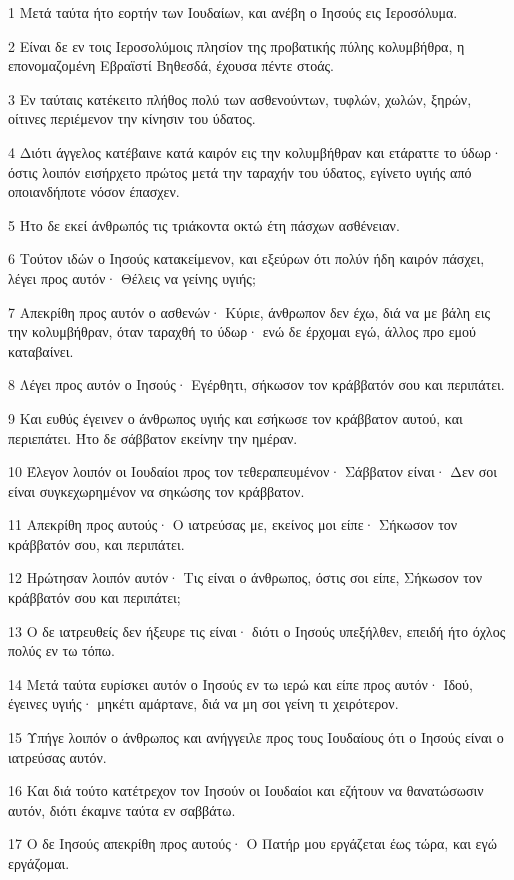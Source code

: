 \par 1 Μετά ταύτα ήτο εορτήν των Ιουδαίων, και ανέβη ο Ιησούς εις Ιεροσόλυμα.
\par 2 Είναι δε εν τοις Ιεροσολύμοις πλησίον της προβατικής πύλης κολυμβήθρα, η επονομαζομένη Εβραϊστί Βηθεσδά, έχουσα πέντε στοάς.
\par 3 Εν ταύταις κατέκειτο πλήθος πολύ των ασθενούντων, τυφλών, χωλών, ξηρών, οίτινες περιέμενον την κίνησιν του ύδατος.
\par 4 Διότι άγγελος κατέβαινε κατά καιρόν εις την κολυμβήθραν και ετάραττε το ύδωρ· όστις λοιπόν εισήρχετο πρώτος μετά την ταραχήν του ύδατος, εγίνετο υγιής από οποιανδήποτε νόσον έπασχεν.
\par 5 Ήτο δε εκεί άνθρωπός τις τριάκοντα οκτώ έτη πάσχων ασθένειαν.
\par 6 Τούτον ιδών ο Ιησούς κατακείμενον, και εξεύρων ότι πολύν ήδη καιρόν πάσχει, λέγει προς αυτόν· Θέλεις να γείνης υγιής;
\par 7 Απεκρίθη προς αυτόν ο ασθενών· Κύριε, άνθρωπον δεν έχω, διά να με βάλη εις την κολυμβήθραν, όταν ταραχθή το ύδωρ· ενώ δε έρχομαι εγώ, άλλος προ εμού καταβαίνει.
\par 8 Λέγει προς αυτόν ο Ιησούς· Εγέρθητι, σήκωσον τον κράββατόν σου και περιπάτει.
\par 9 Και ευθύς έγεινεν ο άνθρωπος υγιής και εσήκωσε τον κράββατον αυτού, και περιεπάτει. Ήτο δε σάββατον εκείνην την ημέραν.
\par 10 Έλεγον λοιπόν οι Ιουδαίοι προς τον τεθεραπευμένον· Σάββατον είναι· Δεν σοι είναι συγκεχωρημένον να σηκώσης τον κράββατον.
\par 11 Απεκρίθη προς αυτούς· Ο ιατρεύσας με, εκείνος μοι είπε· Σήκωσον τον κράββατόν σου, και περιπάτει.
\par 12 Ηρώτησαν λοιπόν αυτόν· Τις είναι ο άνθρωπος, όστις σοι είπε, Σήκωσον τον κράββατόν σου και περιπάτει;
\par 13 Ο δε ιατρευθείς δεν ήξευρε τις είναι· διότι ο Ιησούς υπεξήλθεν, επειδή ήτο όχλος πολύς εν τω τόπω.
\par 14 Μετά ταύτα ευρίσκει αυτόν ο Ιησούς εν τω ιερώ και είπε προς αυτόν· Ιδού, έγεινες υγιής· μηκέτι αμάρτανε, διά να μη σοι γείνη τι χειρότερον.
\par 15 Υπήγε λοιπόν ο άνθρωπος και ανήγγειλε προς τους Ιουδαίους ότι ο Ιησούς είναι ο ιατρεύσας αυτόν.
\par 16 Και διά τούτο κατέτρεχον τον Ιησούν οι Ιουδαίοι και εζήτουν να θανατώσωσιν αυτόν, διότι έκαμνε ταύτα εν σαββάτω.
\par 17 Ο δε Ιησούς απεκρίθη προς αυτούς· Ο Πατήρ μου εργάζεται έως τώρα, και εγώ εργάζομαι.
